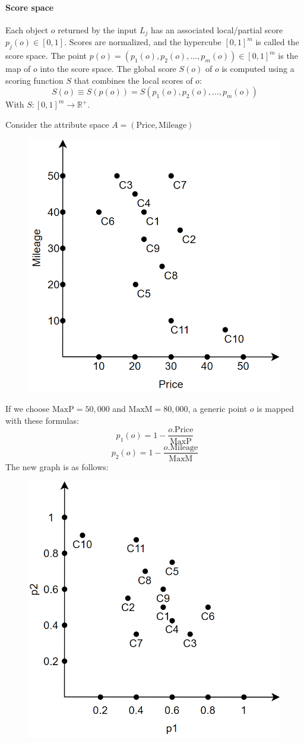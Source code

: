 \paragraph*{Score space}
Each object $o$ returned by the input $L_j$ has an associated local/partial score $p_j(o) \in [0,1]$. 
Scores are normalized, and the hypercube $[0,1]^m$ is called the score space.
The point $p(o) = (p_1(o), p_2(o), \dots, p_m(o)) \in [0,1]^m$ is the map of $o$ into the score space. 
The global score $S(o)$ of $o$ is computed using a scoring function $S$ that combines the local scores of $o$:
\[S(o) \equiv  S(p(o)) = S(p_1(o),p_2(o),\dots,p_m(o))\]
With $S:[0,1]^m \rightarrow \mathbb{R}^{+}$. 
\begin{example}
    Consider the attribute space $A = (\text{Price},\text{Mileage})$
    \begin{figure}[H]
        \centering
        \includegraphics[width=0.25\linewidth]{images/ex1.png}
    \end{figure}
    If we choose $\text{MaxP} = 50,000$ and $\text{MaxM} = 80,000$, a generic point $o$ is mapped with these formulas:
    \[p_1(o) = 1 - \dfrac{o.\text{Price}}{\text{MaxP}}\]
    \[p_2(o) = 1 - \dfrac{o.\text{Mileage}}{\text{MaxM}}\]
    The new graph is as follows: 
    \begin{figure}[H]
        \centering
        \includegraphics[width=0.3\linewidth]{images/ex2.png}
    \end{figure}
\end{example}

